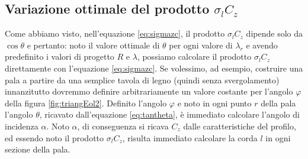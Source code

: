 \subsection{Variazione ottimale del prodotto $\sigma_l C_z$}
Come abbiamo visto, nell'equazione \ref{eq:sigmazc}, il prodotto $\sigma_l C_z$ dipende solo da $\cos \theta$ e pertanto: noto il valore ottimale di $\theta$ per ogni valore di $\lambda_r$ e avendo predefinito i valori di progetto $R$ e $\lambda$, possiamo calcolare il prodotto $\sigma_l C_z$ direttamente con l'equazione \ref{eq:sigmazc}. Se volessimo, ad esempio, costruire una pala a partire da una semplice tavola di legno (quindi senza svergolamento) innanzitutto dovremmo definire arbitrariamente un valore costante per l'angolo $\varphi$ della figura \ref{fig:triangEol2}. Definito l'angolo $\varphi$ e noto in ogni punto $r$ della pala l'angolo $\theta$, ricavato dall'equazione \ref{eq:tantheta}, è immediato calcolare l'angolo di incidenza $\alpha$. Noto $\alpha$, di conseguenza si ricava $C_z$ dalle caratteristiche del profilo, ed essendo noto il prodotto $\sigma_l C_z$, risulta immediato calcolare la corda $l$ in ogni sezione della pala.

